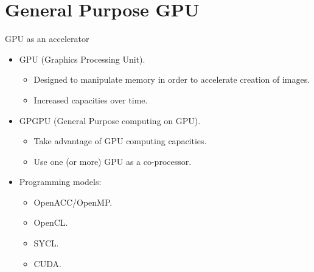 \section{General Purpose GPU}

\begin{frame}[t]{GPU as an accelerator}
\begin{itemize}
  \item GPU (Graphics Processing Unit).
    \begin{itemize}
      \item Designed to manipulate memory in order to accelerate
            creation of images.
      \item Increased capacities over time.
    \end{itemize}

  \item GPGPU (General Purpose computing on GPU).
    \begin{itemize}
      \item Take advantage of GPU computing capacities.
      \item Use one (or more) GPU as a co-processor.
    \end{itemize}

  \item Programming models:
    \begin{itemize}
      \item OpenACC/OpenMP.
      \item OpenCL.
      \item SYCL.
      \item CUDA.
    \end{itemize}
\end{itemize}
\end{frame}


